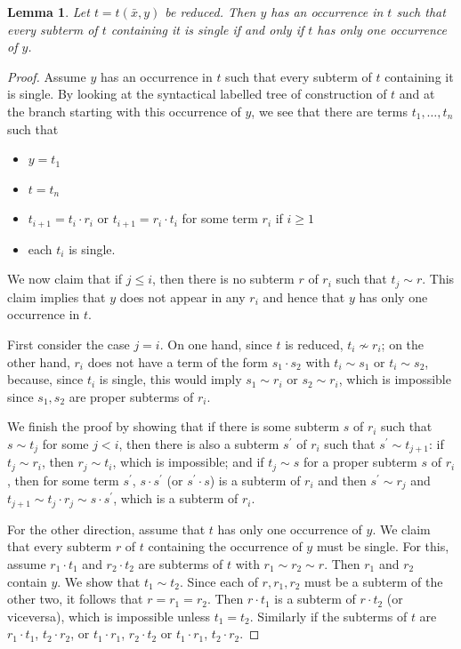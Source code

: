 \documentclass[a4paper, 11pt]{article}
\theoremstyle{note}
\newtheorem{lemma}[thm]{Lemma}
\begin{document}
	\begin{lemma}\label{June9_1} Let $t= t(\bar{x},y)$ be reduced. Then  $y$ has an occurrence in $t$ such that every subterm of $t$ containing it is single if and only if  $t$ has only one occurrence of $y$.
	\end{lemma}
	\begin{proof} Assume $y$ has an occurrence in $t$ such that every subterm of $t$ containing it is single.  By looking at the syntactical labelled tree of construction of $t$ and at the branch starting with this occurrence of $y$, we see that there are terms $t_1,\ldots,t_n$  such that
		\begin{itemize}
			\item $y = t_1$
			\item $t= t_n$
			\item $t_{i+1}= t_i\cdot r_i$  or  $t_{i+1}= r_i\cdot t_i$ for some term $r_i$  if $i\geq 1$
			\item each $t_i$ is single.
		\end{itemize}
		We now claim that if $j\leq i$, then there is no subterm $r$ of $r_i$  such that $t_j\sim r$. This claim implies that $y$ does not appear in any $r_i$ and hence that $y$ has only one occurrence in $t$. 
		
		First consider the case $j=i$. On one hand, since $t$ is reduced, $t_i\not\sim r_i$; on the other hand, $r_i$ does not have a term of the form  $s_1\cdot s_2$  with $t_i\sim s_1$ or $t_i\sim s_2$,  because, since $t_i$ is single, this would imply $s_1\sim r_i$ or $s_2\sim r_i$, which is impossible since  $s_1,s_2$  are proper subterms of $r_i$.
		
		We finish the proof by showing that if there is some subterm $s$ of $r_i$ such that $s\sim t_j$ for some $j < i$, then there is also a subterm $s^\prime$ of $r_i$ such that $s^\prime\sim t_{j+1}$:  if $t_j\sim r_i$, then $r_j\sim t_i$, which is impossible; and if  $t_j\sim s$ for a proper subterm $s$ of $r_i$, then for some term $s^\prime$, $s\cdot s^\prime$  (or $s^\prime\cdot s$) is a subterm of $r_i$ and then  $s^\prime\sim r_j$ and $t_{j+1}\sim t_j\cdot r_j \sim s\cdot s^\prime$, which is a subterm of $r_i$.
		
		For the other direction, assume that $t$ has only one occurrence of $y$. We claim that every subterm $r$ of $t$ containing the occurrence of $y$ must be single. For this, assume $r_1\cdot t_1$ and $r_2\cdot t_2$ are subterms of $t$  with  $r_1\sim r_2\sim r$. Then $r_1$ and $r_2$ contain $y$. We show that $t_1\sim t_2$.  Since each of $r,r_1,r_2$ must be a subterm of the other two, it follows that $r=r_1=r_2$. Then $r\cdot t_1$ is a subterm of $r\cdot t_2$ (or viceversa), which is impossible unless $t_1=t_2$.   Similarly if the subterms of $t$ are $r_1\cdot t_1$, $t_2\cdot r_2$,  or  $t_1\cdot r_1$, $r_2\cdot t_2$ or  $t_1\cdot r_1$, $t_2\cdot r_2$.
\end{proof}
	
\end{document}
